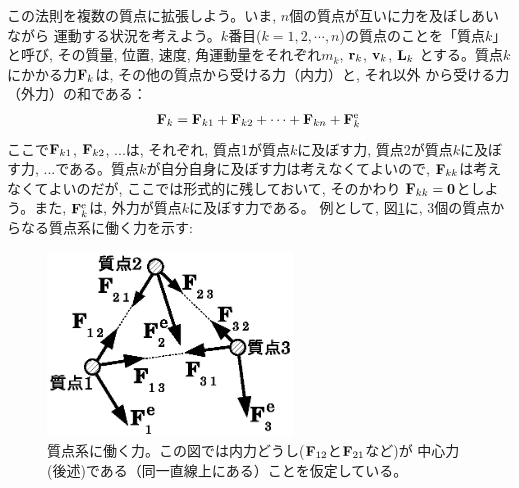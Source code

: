 この法則を複数の質点に拡張しよう。いま, $n$個の質点が互いに力を及ぼしあいながら
運動する状況を考えよう。$k$番目($k=1, 2, \cdots, n$)の質点のことを「質点$k$」と呼び, 
その質量, 位置, 速度, 角運動量をそれぞれ$m_k$, ${\bf r}_k$, ${\bf v}_k$, ${\bf L}_k$
とする。質点$k$にかかる力${\bf F}_k$は, その他の質点から受ける力（内力）と, それ以外
から受ける力（外力）の和である：
\begin{eqnarray} 
{\bf F}_k={\bf F}_{k1}+{\bf F}_{k2}+\cdots+{\bf F}_{kn}+{\bf F}_{k}^{\text{e}}\label{eq:multiforce}
\end{eqnarray} 
ここで${\bf F}_{k1}$, ${\bf F}_{k2}$, ...は, それぞれ, 質点1が質点$k$に及ぼす力, 
質点2が質点$k$に及ぼす力, ...である。質点$k$が自分自身に及ぼす力は考えなくてよいので, 
${\bf F}_{kk}$は考えなくてよいのだが, ここでは形式的に残しておいて, そのかわり
${\bf F}_{kk}={\bf 0}$としよう。また, ${\bf F}_{k}^{\text{e}}$は, 外力が質点$k$に及ぼす力である。
例として, 図\ref{fig:angular_mom_sys}に, 3個の質点からなる質点系に働く力を示す:

\begin{figure}[h]
    \centering
    \includegraphics[width=6.5cm]{angular_mom_sys.eps}
    \caption{質点系に働く力。この図では内力どうし(${\bf F}_{12}$と${\bf F}_{21}$など)が
中心力(後述)である（同一直線上にある）ことを仮定している。}\label{fig:angular_mom_sys}
\end{figure}

